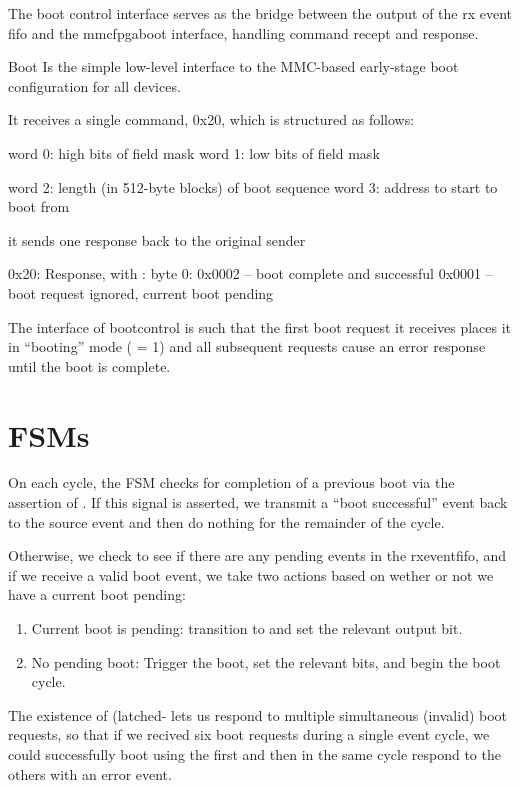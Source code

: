 The boot control interface serves as the bridge between the output of
the rx event fifo and the mmcfpgaboot interface, handling command
recept and response.

Boot Is the simple low-level interface to the MMC-based early-stage
boot configuration for all devices. 

It receives a single command, 0x20, which is structured as follows: 


word 0: high bits of field mask
word 1: low bits of field mask

word 2: length (in 512-byte blocks) of boot sequence
word 3: address to start to boot from

it sends one response back to the original sender


0x20: Response, with : 
   byte 0: 0x0002 -- boot complete and successful
	   0x0001 -- boot request ignored, current boot pending


           The interface of bootcontrol is such that the first boot
           request it receives places it in ``booting'' mode
           ( = 1) and all subsequent requests cause an
           error response until the boot is complete.

\section{FSMs}

On each cycle, the FSM checks for completion of a previous boot via the assertion of . If this signal is asserted, we transmit a ``boot successful'' event back to the source event and then do nothing for the remainder of the cycle. 

Otherwise, we check to see if there are any pending events in the rxeventfifo, and if we receive a valid boot event, we take two actions based on wether or not we have a current boot pending:

\begin{enumerate}
\item Current boot is pending: transition to  and set the relevant output bit.
\item No pending boot: Trigger the boot, set the relevant bits, and begin the boot cycle. 
\end{enumerate}

The existence of  (latched- lets us respond
to multiple simultaneous (invalid) boot requests, so that if we
recived six boot requests during a single event cycle, we could
successfully boot using the first and then in the same cycle respond
to the others with an error event.
